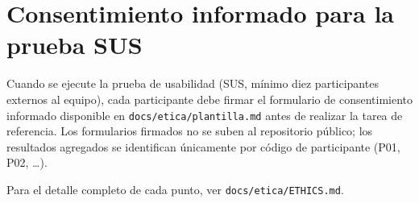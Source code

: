 \section{Consentimiento informado para la prueba SUS}

Cuando se ejecute la prueba de usabilidad (SUS, m\'inimo diez
participantes externos al equipo), cada participante debe firmar el
formulario de consentimiento informado disponible en
\texttt{docs/etica/plantilla.md} antes de realizar la tarea de referencia.
Los formularios firmados no se suben al repositorio p\'ublico; los
resultados agregados se identifican \'unicamente por c\'odigo de
participante (P01, P02, \ldots).

Para el detalle completo de cada punto, ver \texttt{docs/etica/ETHICS.md}.
